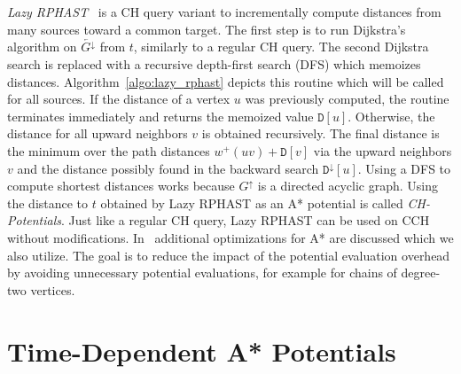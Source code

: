 \documentclass[a4paper,UKenglish,cleveref, autoref, thm-restate]{lipics-v2021}
\newcommand*{\gchu}{G^{\uparrow}}
\newcommand*{\gchd}{\overleftarrow{G^{\downarrow}}}
\begin{document}
\emph{Lazy RPHAST}~\cite{strasser_et_al:LIPIcs.SEA.2021.6} is a CH query variant to incrementally compute distances from many sources toward a common target.
The first step is to run Dijkstra's algorithm on $\gchd$ from $t$, similarly to a regular CH query.
The second Dijkstra search is replaced with a recursive depth-first search (DFS) which memoizes distances.
Algorithm~\ref{algo:lazy_rphast} depicts this routine which will be called for all sources.
If the distance of a vertex $u$ was previously computed, the routine terminates immediately and returns the memoized value $\mathtt{D}[u]$.
Otherwise, the distance for all upward neighbors $v$ is obtained recursively.
The final distance is the minimum over the path distances $w^+(uv) + \mathtt{D}[v]$ via the upward neighbors $v$ and the distance possibly found in the backward search $\mathtt{D}^{\downarrow}[u]$.
Using a DFS to compute shortest distances works because $\gchu$ is a directed acyclic graph.
Using the distance to $t$ obtained by Lazy RPHAST as an A* potential is called \emph{CH-Potentials}.
Just like a regular CH query, Lazy RPHAST can be used on CCH without modifications.
In~\cite{strasser_et_al:LIPIcs.SEA.2021.6} additional optimizations for A* are discussed which we also utilize.
The goal is to reduce the impact of the potential evaluation overhead by avoiding unnecessary potential evaluations, for example for chains of degree-two vertices.

\section{Time-Dependent A* Potentials}
\end{document}
